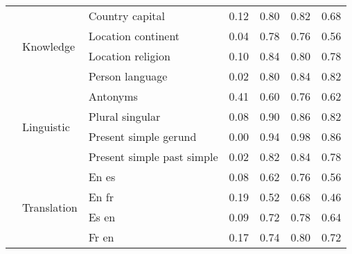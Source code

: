 \begin{center}
\begin{longtable}{lllrrrr}
\cline{2-7}
 & \multirow[t]{4}{*}{Knowledge} & Country capital & 0.12 & 0.80 & 0.82 & 0.68 \\
 &  & Location continent & 0.04 & 0.78 & 0.76 & 0.56 \\
 &  & Location religion & 0.10 & 0.84 & 0.80 & 0.78 \\
 &  & Person language & 0.02 & 0.80 & 0.84 & 0.82 \\
\cline{2-7}
 & \multirow[t]{4}{*}{Linguistic} & Antonyms & 0.41 & 0.60 & 0.76 & 0.62 \\
 &  & Plural singular & 0.08 & 0.90 & 0.86 & 0.82 \\
 &  & Present simple gerund & 0.00 & 0.94 & 0.98 & 0.86 \\
 &  & Present simple past simple & 0.02 & 0.82 & 0.84 & 0.78 \\
\cline{2-7}
 & \multirow[t]{4}{*}{Translation} & En es & 0.08 & 0.62 & 0.76 & 0.56 \\
 &  & En fr & 0.19 & 0.52 & 0.68 & 0.46 \\
 &  & Es en & 0.09 & 0.72 & 0.78 & 0.64 \\
 &  & Fr en & 0.17 & 0.74 & 0.80 & 0.72 \\
\cline{1-7} \cline{2-7}
\bottomrule
\end{longtable}

\end{center}
\twocolumn